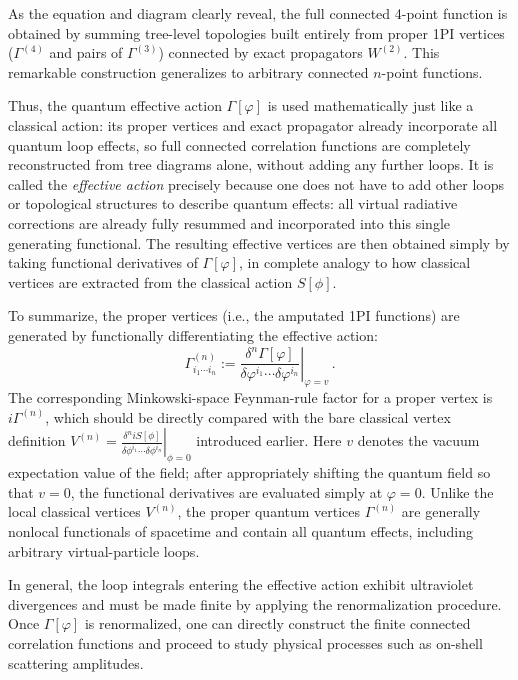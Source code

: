 As the equation and diagram clearly reveal, the full connected 4-point function is obtained by summing tree-level topologies built entirely from proper 1PI vertices (\(\Gamma^{(4)}\) and pairs of \(\Gamma^{(3)}\)) connected by exact propagators \(W^{(2)}\). This remarkable construction generalizes to arbitrary connected \(n\)-point functions.

Thus, the quantum effective action \(\Gamma[\varphi]\) is used mathematically just like a classical action: its proper vertices and exact propagator already incorporate all quantum loop effects, so full connected correlation functions are completely reconstructed from tree diagrams alone, without adding any further loops. It is called the \textit{effective action} precisely because one does not have to add other loops or topological structures to describe quantum effects: all virtual radiative corrections are already fully resummed and incorporated into this single generating functional. The resulting effective vertices are then obtained simply by taking functional derivatives of \(\Gamma[\varphi]\), in complete analogy to how classical vertices are extracted from the classical action \(S[\phi]\).

To summarize, the proper vertices (i.e., the amputated 1PI functions) are generated by functionally differentiating the effective action:
\begin{equation} \label{eq:proper_vertices_summary}
    \boxed{\Gamma^{(n)}_{i_1 \cdots i_n} := \left. \frac{\delta^n \Gamma[\varphi]}{\delta \varphi^{i_1} \cdots \delta \varphi^{i_n}} \right|_{\varphi = v}} \, .
\end{equation}
The corresponding Minkowski-space Feynman-rule factor for a proper vertex is \(i\Gamma^{(n)}\), which should be directly compared with the bare classical vertex definition \(V^{(n)} = \left. \frac{\delta^n iS[\phi]}{\delta \phi^{i_1} \cdots \delta \phi^{i_n}} \right|_{\phi=0}\) introduced earlier. Here \(v\) denotes the vacuum expectation value of the field; after appropriately shifting the quantum field so that \(v = 0\), the functional derivatives are evaluated simply at \(\varphi = 0\). Unlike the local classical vertices \(V^{(n)}\), the proper quantum vertices \(\Gamma^{(n)}\) are generally nonlocal functionals of spacetime and contain all quantum effects, including arbitrary virtual-particle loops.

In general, the loop integrals entering the effective action exhibit ultraviolet divergences and must be made finite by applying the renormalization procedure. Once \(\Gamma[\varphi]\) is renormalized, one can directly construct the finite connected correlation functions and proceed to study physical processes such as on-shell scattering amplitudes.

